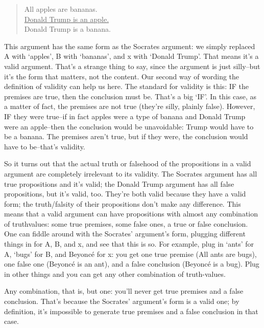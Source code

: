 \begin{quote}
All apples are bananas. \\
\underline{Donald Trump is an apple.} \\
Donald Trump is a banana. \\
\end{quote}

This argument has the same form as the Socrates argument: we simply replaced A with `apples',
B with `bananas', and x with `Donald Trump'. That means it's a valid argument. That's a strange
thing to say, since the argument is just silly--but it's the form that matters, not the content. Our
second way of wording the definition of validity can help us here. The standard for validity is this:
IF the premises are true, then the conclusion must be. That's a big `IF'. In this case, as a matter of
fact, the premises are not true (they're silly, plainly false). However, IF they were true--if in fact
apples were a type of banana and Donald Trump were an apple--then the conclusion would be
unavoidable: Trump would have to be a banana. The premises aren't true, but if they were, the
conclusion would have to be--that's validity.

So it turns out that the actual truth or falsehood of the propositions in a valid argument are
completely irrelevant to its validity. The Socrates argument has all true propositions and it's valid;
the Donald Trump argument has all false propositions, but it's valid, too. They're both valid
because they have a valid form; the truth/falsity of their propositions don't make any difference.
This means that a valid argument can have propositions with almost any combination of truthvalues: 
some true premises, some false ones, a true or false conclusion. One can fiddle around with
the Socrates' argument's form, plugging different things in for A, B, and x, and see that this is so.
For example, plug in `ants' for A, `bugs' for B, and Beyoncé for x: you get one true premise (All
ants are bugs), one false one (Beyonc\'{e} is an ant), and a false conclusion (Beyonc\'{e} is a bug). Plug
in other things and you can get any other combination of truth-values.

Any combination, that is, but one: you'll never get true premises and a false conclusion. That's
because the Socrates' argument's form is a valid one; by definition, it's impossible to generate true
premises and a false conclusion in that case.

